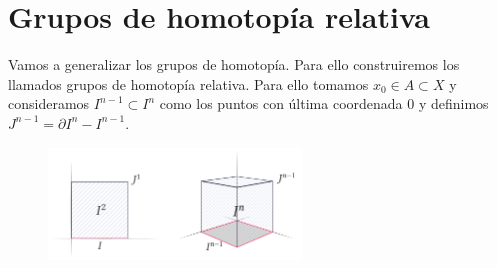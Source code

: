 \section{Grupos de homotopía relativa}
Vamos a generalizar los grupos de homotopía. Para ello construiremos los llamados grupos de homotopía relativa. Para ello tomamos $x_0 \in A \subset X$ y consideramos $I^{n-1} \subset I^n$ como los puntos con última coordenada $0$ y  definimos  $J^{n-1} = \partial I^n - I^{n-1}$. \par
\begin{figure}[h]
\centering
\includegraphics[width = 0.6\textwidth]{images/defghomot}
\end{figure}

